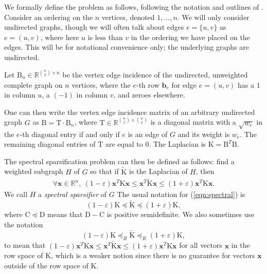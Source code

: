 \documentclass[11pt]{article}
\newcommand{\mat}[1]{{\ensuremath{\bm{\mathrm{#1}}}}}
\def\b{{\mathbf b}}
\def\matB{\mat{B}}
\def\matC{\mat{C}}
\def\matD{\mat{D}}
\def\matK{\mat{K}}
\def\matT{\mat{T}}
\def\x{{\mathbf x}}
\def\b{{\mathbf b}}
\newcommand{\eps}{\varepsilon}
\begin{document}
We formally define the problem as follows, following the notation and outlines of \cite{KLMMS14}. 
Consider an ordering on the $n$ vertices, denoted $1, \ldots, n$. We will only
consider undirected graphs, though we will often talk about edges $e = \{u,v\}$ as $e = (u,v)$, where here $u$ is less than
$v$ in the ordering we have placed on the edges. This will be for notational convenience only; the underlying graphs are 
undirected. 

Let $\matB_n \in \mathbb{R}^{\binom{n}{2} \times n}$ be the vertex edge incidence of the
undirected, unweighted complete graph on $n$ vertices, where the $e$-th row $\b_e$ for edge $e = (u,v)$ has a $1$ in column
$u$, a $(-1)$ in column $v$, and zeroes elsewhere. 

One can then write the vertex edge incidence matrix of an arbitrary undirected graph $G$ as 
$\matB = \matT \cdot \matB_n$, where $\matT \in \mathbb{R}^{\binom{n}{2} \times \binom{n}{2}}$ is a diagonal matrix with a $\sqrt{w_e}$ in the $e$-th
diagonal entry if and only if $e$ is an edge of $G$ and its weight is $w_e$. 
The remaining diagonal entries of $\matT$ are equal to $0$. The
Laplacian is $\matK = \matB^T\matB$. 

The spectral sparsification problem can then be defined as follows: find a weighted subgraph $H$ of $G$ so that if 
$\tilde{\matK}$ is the Laplacian of $H$, then 
\begin{eqnarray}\label{eqn:spectral}
\forall \x \in \mathbb{R}^n, \ (1-\eps)\x^T \matK \x \leq \x^T \tilde{\matK} \x \leq (1+\eps) \x^T \matK \x.
\end{eqnarray}
We call $H$ a {\it spectral sparsifier} of $G$ 
The usual notation for (\ref{eqn:spectral}) is
$$(1-\varepsilon) \matK \preceq \tilde{\matK} \preceq (1+\varepsilon) \matK,$$
where $\matC \preceq \matD$ means that $\matD-\matC$ is positive semidefinite. We also sometimes use the notation
$$(1-\varepsilon) \matK \preceq_R \tilde{\matK} \preceq_R (1+\varepsilon) \matK,$$ 
to mean that $(1-\varepsilon)\x^T \matK \x \leq \x^T \tilde{\matK} \x \leq (1+\varepsilon) \x^T\matK\x$ for all vectors $\x$
in the row space of $\matK$, which is a weaker notion since there is no guarantee for vectors $\x$
outside of the row space of $\matK$. 
\end{document}
